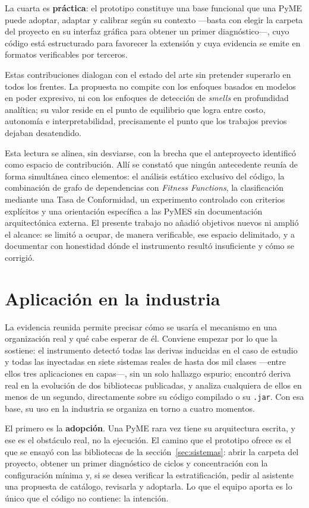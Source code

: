 La cuarta es \textbf{práctica}: el prototipo constituye una base funcional que una PyME puede adoptar, adaptar y calibrar según su contexto —basta con elegir la carpeta del proyecto en su interfaz gráfica para obtener un primer diagnóstico—, cuyo código está estructurado para favorecer la extensión y cuya evidencia se emite en formatos verificables por terceros.

Estas contribuciones dialogan con el estado del arte sin pretender superarlo en todos los frentes. La propuesta no compite con los enfoques basados en modelos en poder expresivo, ni con los enfoques de detección de \textit{smells} en profundidad analítica; su valor reside en el punto de equilibrio que logra entre costo, autonomía e interpretabilidad, precisamente el punto que los trabajos previos dejaban desatendido.

Esta lectura se alinea, sin desviarse, con la brecha que el anteproyecto identificó como espacio de contribución. Allí se constató que ningún antecedente reunía de forma simultánea cinco elementos: el análisis estático exclusivo del código, la combinación de grafo de dependencias con \textit{Fitness Functions}, la clasificación mediante una Tasa de Conformidad, un experimento controlado con criterios explícitos y una orientación específica a las PyMES sin documentación arquitectónica externa. El presente trabajo no añadió objetivos nuevos ni amplió el alcance: se limitó a ocupar, de manera verificable, ese espacio delimitado, y a documentar con honestidad dónde el instrumento resultó insuficiente y cómo se corrigió.

\section{Aplicación en la industria}
\label{sec:industria}
La evidencia reunida permite precisar cómo se usaría el mecanismo en una organización real y qué cabe esperar de él. Conviene empezar por lo que la sostiene: el instrumento detectó todas las derivas inducidas en el caso de estudio y todas las inyectadas en siete sistemas reales de hasta dos mil clases ---entre ellos tres aplicaciones en capas---, sin un solo hallazgo espurio; encontró deriva real en la evolución de dos bibliotecas publicadas, y analiza cualquiera de ellos en menos de un segundo, directamente sobre su código compilado o su \texttt{.jar}. Con esa base, su uso en la industria se organiza en torno a cuatro momentos.

El primero es la \textbf{adopción}. Una PyME rara vez tiene su arquitectura escrita, y ese es el obstáculo real, no la ejecución. El camino que el prototipo ofrece es el que se ensayó con las bibliotecas de la sección~\ref{sec:sistemas}: abrir la carpeta del proyecto, obtener un primer diagnóstico de ciclos y concentración con la configuración mínima y, si se desea verificar la estratificación, pedir al asistente una propuesta de catálogo, revisarla y adoptarla. Lo que el equipo aporta es lo único que el código no contiene: la intención.

